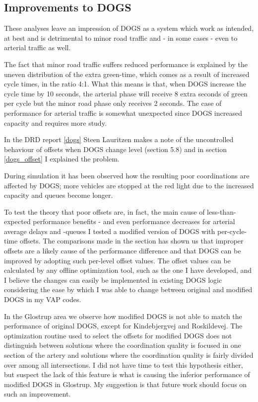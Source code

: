 \subsection*{Improvements to DOGS}
These analyses leave an impression of DOGS as a system which work as intended, at best and is detrimental to minor road traffic and - in some cases - even to arterial traffic as well.

The fact that minor road traffic suffers reduced performance is explained by the uneven distribution of the extra green-time, which comes as a result of increased cycle times, in the ratio 4:1. What this means is that, when DOGS increase the cycle time by 10 seconds, the arterial phase will receive 8 extra seconds of green per cycle but the minor road phase only receives 2 seconds. 
The case of performance for arterial traffic is somewhat unexpected since DOGS increased capacity and requires more study.

In the DRD report \ref{dogs} Steen Lauritzen makes a note of the uncontrolled behaviour of offsets when DOGS change level (section 5.8) and in section \ref{dogs_offset} I explained the problem.

During simulation it has been observed how the resulting poor coordinations are affected by DOGS; more vehicles are stopped at the red light due to the increased capacity and queues become longer. 

To test the theory that poor offsets are, in fact, the main cause of less-than-expected performance benefits - and even performance decreases for arterial average delays and -queues I tested a modified version of DOGS with per-cycle-time offsets. The comparisons made in the section has shown us that improper offsets are a likely cause of the performance difference and that DOGS can be improved by adopting such per-level offset values. The offset values can be calculated by any offline optimization tool, such as the one I have developed, and I believe the changes can easily be implemented in existing DOGS logic considering the ease by which I was able to change between original and modified DOGS in my VAP codes.

In the Glostrup area we observe how modified DOGS is not able to match the performance of original DOGS, except for Kindebjergvej and Roskildevej. The optimization routine used to select the offsets for modified DOGS does not distinguish between solutions where the coordination quality is focused in one section of the artery and solutions where the coordination quality is fairly divided over among all intersections. I did not have time to test this hypothesis either, but suspect the lack of this feature is what is causing the inferior performance of modified DOGS in Glostrup. My suggestion is that future work should focus on such an improvement.

